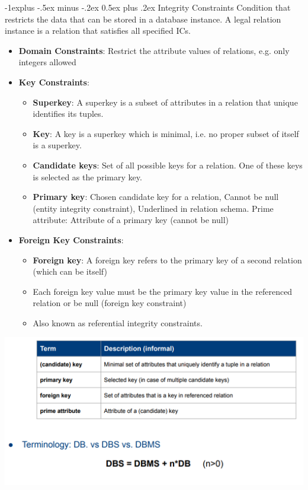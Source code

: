 \documentclass[12pt, landscape]{article}
\makeatletter
\renewcommand{\subsection}{\@startsection{subsection}{2}{0.1mm}%
                                {-1explus -.5ex minus -.2ex}%
                                {0.5ex plus .2ex}%
                                {\normalfont\normalsize\bfseries}}
\makeatother
\begin{document}
\begin{multicols*}{3}
{\subsection{Integrity Constraints}
Condition that restricts the data that can be stored in a database instance. A legal relation instance is a relation that satisfies all specified ICs.
\begin{itemize}
	\item \textbf{Domain Constraints}:  Restrict the attribute values of relations, e.g. only integers allowed
	\item \textbf{Key Constraints}:
	\begin{itemize}
		\item \textbf{Superkey}: A superkey is a subset of attributes in a relation that unique identifies its tuples.
		\item \textbf{Key}:  A key is a superkey which is minimal, i.e. no proper subset of itself is a superkey. 
		\item \textbf{Candidate keys}: Set of all possible keys for a relation. One of these keys is selected as the primary key.
		\item \textbf{Primary key}: Chosen candidate key for a relation, Cannot be null (entity integrity constraint), Underlined in relation schema. Prime attribute: Attribute of a primary key (cannot be null)
	\end{itemize}
	\item \textbf{Foreign Key Constraints}:
	\begin{itemize}
		\item \textbf{Foreign key}:   A foreign key refers to the primary key of a second relation (which can be itself)
		\item Each foreign key value must be the primary key value in the referenced relation or be null (foreign key constraint)
		\item  Also known as referential integrity constraints.
	\end{itemize}
\end{itemize}
\centerline{\includegraphics[width=1 \linewidth]{integrityconstraints}}
}


\end{multicols*}
\end{document}
